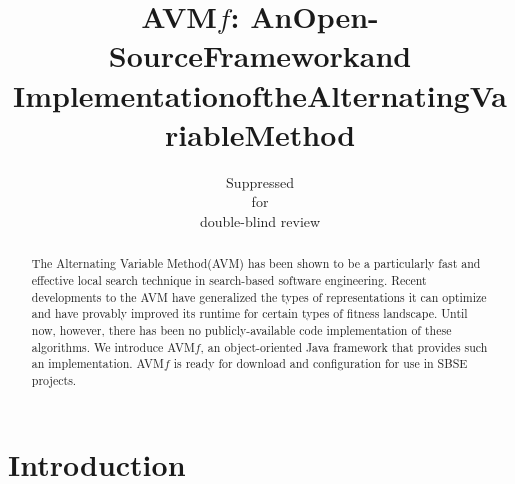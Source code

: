 \documentclass{llncs}
\newcommand{\AVM}{Alternating Variable Method\xspace}
\newcommand{\name}{AVM\hspace{-1pt}$f$\xspace}
\begin{document}
\title{\name: An\:Open-Source\:Framework\:and\\$\!$Implementation\:of\:the\:Alternating\:Variable\:Method\vspace{-.5em}}



\author{
	Suppressed\\
	for\\
	\vspace{1mm} \small{double-blind review}
	\vspace{-2em}
}
\institute{}

\maketitle

\begin{abstract}
The \AVM (AVM) has been shown to be a particularly fast and effective local search technique in search-based software engineering. %
%
Recent developments to the AVM have generalized the types of representations it can optimize and have provably improved its runtime for certain types of fitness landscape. Until now, however, there has been no publicly-available code implementation of these algorithms. We introduce \name, an object-oriented Java framework that provides such an implementation. \name is ready for download and configuration for use in SBSE projects.

\end{abstract}

\section{Introduction}
\end{document}
